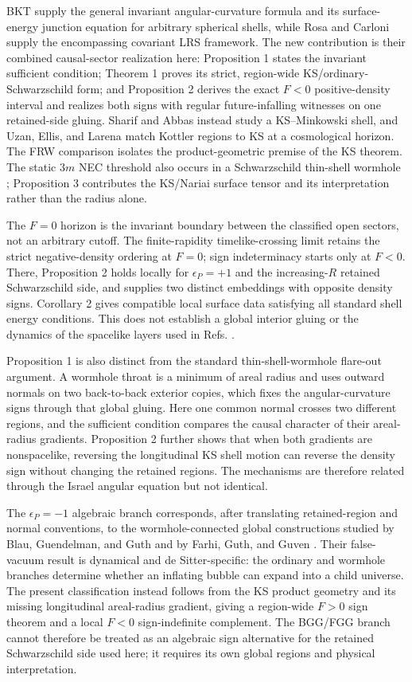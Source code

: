 \documentclass[pdflatex,sn-mathphys-num]{sn-jnl}
\begin{document}
BKT \cite{ref2} supply the general invariant angular-curvature formula and its surface-energy junction equation for arbitrary spherical shells, while Rosa and Carloni \cite{ref6} supply the encompassing covariant LRS framework. The new contribution is their combined causal-sector realization here: Proposition 1 states the invariant sufficient condition; Theorem 1 proves its strict, region-wide KS/ordinary-Schwarzschild form; and Proposition 2 derives the exact \(F<0\) positive-density interval and realizes both signs with regular future-infalling witnesses on one retained-side gluing. Sharif and Abbas \cite{ref18} instead study a KS--Minkowski shell, and Uzan, Ellis, and Larena \cite{ref19} match Kottler regions to KS at a cosmological horizon. The FRW comparison isolates the product-geometric premise of the KS theorem. The static \(3m\) NEC threshold also occurs in a Schwarzschild thin-shell wormhole \cite{ref13}; Proposition 3 contributes the KS/Nariai surface tensor and its interpretation rather than the radius alone.


The \(F=0\) horizon is the invariant boundary between the classified open sectors, not an arbitrary cutoff. The finite-rapidity timelike-crossing limit retains the strict negative-density ordering at \(F=0\); sign indeterminacy starts only at \(F<0\). There, Proposition 2 holds locally for \(\epsilon_P=+1\) and the increasing-\(R\) retained Schwarzschild side, and supplies two distinct embeddings with opposite density signs. Corollary 2 gives compatible local surface data satisfying all standard shell energy conditions. This does not establish a global interior gluing or the dynamics of the spacelike layers used in Refs. \cite{ref8,ref9,ref17}.


Proposition 1 is also distinct from the standard thin-shell-wormhole flare-out argument. A wormhole throat is a minimum of areal radius and uses outward normals on two back-to-back exterior copies, which fixes the angular-curvature signs through that global gluing. Here one common normal crosses two different regions, and the sufficient condition compares the causal character of their areal-radius gradients. Proposition 2 further shows that when both gradients are nonspacelike, reversing the longitudinal KS shell motion can reverse the density sign without changing the retained regions. The mechanisms are therefore related through the Israel angular equation but not identical.


The \(\epsilon_P=-1\) algebraic branch corresponds, after translating retained-region and normal conventions, to the wormhole-connected global constructions studied by Blau, Guendelman, and Guth and by Farhi, Guth, and Guven \cite{ref4,ref5}. Their false-vacuum result is dynamical and de Sitter-specific: the ordinary and wormhole branches determine whether an inflating bubble can expand into a child universe. The present classification instead follows from the KS product geometry and its missing longitudinal areal-radius gradient, giving a region-wide \(F>0\) sign theorem and a local \(F<0\) sign-indefinite complement. The BGG/FGG branch cannot therefore be treated as an algebraic sign alternative for the retained Schwarzschild side used here; it requires its own global regions and physical interpretation.
\end{document}

